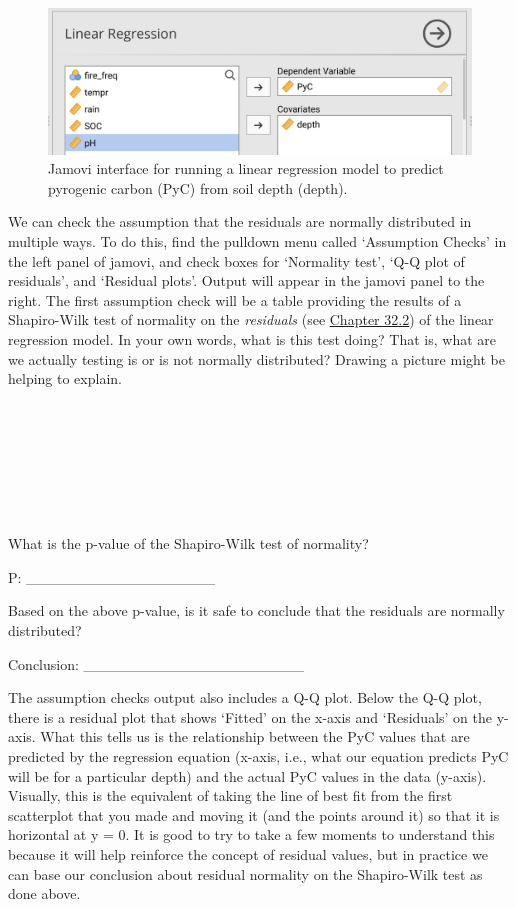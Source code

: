 \documentclass[
  openany]{scrbook}
\begin{document}
\begin{figure}
\includegraphics[width=1\linewidth]{img/Jamovi_linear_regression} \caption{Jamovi interface for running a linear regression model to predict pyrogenic carbon (PyC) from soil depth (depth).}\label{fig:unnamed-chunk-153}
\end{figure}

We can check the assumption that the residuals are normally distributed in multiple ways.
To do this, find the pulldown menu called `Assumption Checks' in the left panel of jamovi, and check boxes for `Normality test', `Q-Q plot of residuals', and `Residual plots'.
Output will appear in the jamovi panel to the right.
The first assumption check will be a table providing the results of a Shapiro-Wilk test of normality on the \emph{residuals} (see \protect\hyperlink{intercepts-slopes-and-residuals}{Chapter 32.2}) of the linear regression model.
In your own words, what is this test doing?
That is, what are we actually testing is or is not normally distributed?
Drawing a picture might be helping to explain.

\begin{verbatim}







\end{verbatim}

What is the p-value of the Shapiro-Wilk test of normality?

P: \_\_\_\_\_\_\_\_\_\_\_\_\_\_\_\_\_\_

Based on the above p-value, is it safe to conclude that the residuals are normally distributed?

Conclusion: \_\_\_\_\_\_\_\_\_\_\_\_\_\_\_\_\_\_\_\_\_

The assumption checks output also includes a Q-Q plot.
Below the Q-Q plot, there is a residual plot that shows `Fitted' on the x-axis and `Residuals' on the y-axis.
What this tells us is the relationship between the PyC values that are predicted by the regression equation (x-axis, i.e., what our equation predicts PyC will be for a particular depth) and the actual PyC values in the data (y-axis).
Visually, this is the equivalent of taking the line of best fit from the first scatterplot that you made and moving it (and the points around it) so that it is horizontal at y = 0.
It is good to try to take a few moments to understand this because it will help reinforce the concept of residual values, but in practice we can base our conclusion about residual normality on the Shapiro-Wilk test as done above.
\end{document}

